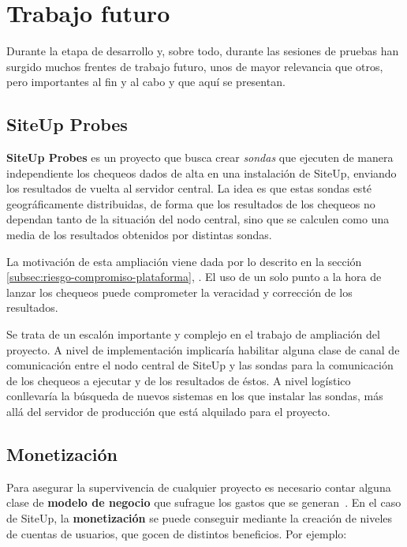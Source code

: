 \section{Trabajo futuro}

Durante la etapa de desarrollo y, sobre todo, durante las sesiones de pruebas
han surgido muchos frentes de trabajo futuro, unos de mayor relevancia que
otros, pero importantes al fin y al cabo y que aquí se presentan.

\subsection{SiteUp Probes}

\textbf{SiteUp Probes} es un proyecto que busca crear \textit{sondas} que
ejecuten de manera independiente los chequeos dados de alta en una instalación
de SiteUp, enviando los resultados de vuelta al servidor central. La idea es que
estas sondas esté geográficamente distribuidas, de forma que los resultados de
los chequeos no dependan tanto de la situación del nodo central, sino que se
calculen como una media de los resultados obtenidos por distintas sondas.

La motivación de esta ampliación viene dada por lo descrito en la sección
\ref{subsec:riesgo-compromiso-plataforma},
\textit{}. El uso de un solo punto
a la hora de lanzar los chequeos puede comprometer la veracidad y corrección de
los resultados.

Se trata de un escalón importante y complejo en el trabajo de ampliación del
proyecto. A nivel de implementación implicaría habilitar alguna clase de canal
de comunicación entre el nodo central de SiteUp y las sondas para la
comunicación de los chequeos a ejecutar y de los resultados de éstos. A nivel
logístico conllevaría la búsqueda de nuevos sistemas en los que instalar las
sondas, más allá del servidor de producción que está alquilado para el proyecto.

\subsection{Monetización}

Para asegurar la supervivencia de cualquier proyecto es necesario contar alguna
clase de \textbf{modelo de negocio} que sufrague los gastos que se
generan~\cite{startupsFail}. En el caso de SiteUp, la \textbf{monetización} se
puede conseguir mediante la creación de niveles de cuentas de usuarios, que
gocen de distintos beneficios. Por ejemplo:

